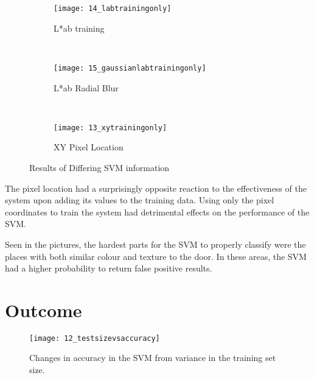 \begin{figure}
        \centering
        \begin{subfigure}[b]{0.3\textwidth}
                \centering
                \texttt{[image: 14\_labtrainingonly]}
                \caption{L*ab training}
                \label{fig:14_labtrainingonly}
        \end{subfigure}%
        ~ %
        \begin{subfigure}[b]{0.3\textwidth}
                \centering
                \texttt{[image: 15\_gaussianlabtrainingonly]}
                \caption{L*ab Radial Blur}
                \label{fig:15_gaussianlabtrainingonly}
        \end{subfigure}
        ~ %
        \begin{subfigure}[b]{0.3\textwidth}
                \centering
                \texttt{[image: 13\_xytrainingonly]}
                \caption{XY Pixel Location}
                \label{fig:13_xytrainingonly}
        \end{subfigure}
        \caption{Results of Differing SVM information}\label{fig:animals}
\end{figure}

The pixel location had a surprisingly opposite reaction to the effectiveness of the system upon adding its values to the training data. Using only the pixel coordinates to train the system had detrimental effects on the performance of the SVM. 

Seen in the pictures, the hardest parts for the SVM to properly classify were the places with both similar colour and texture to the door. In these areas, the SVM had a higher probability to return false positive results.

\newpage

\section{Outcome}

\begin{figure}[ht]
    \centering
    \texttt{[image: 12\_testsizevsaccuracy]}
    \caption{Changes in accuracy in the SVM from variance in the training set size.}
    \label{fig:12_testsizevsaccuracy}
\end{figure}

